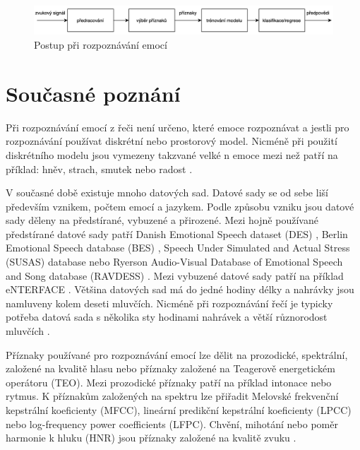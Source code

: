 \documentclass[FM,BP]{tulthesis}
\begin{document}
\begin{figure}[htbp]
\centerline{\includegraphics[width=\textwidth,height=\textheight,keepaspectratio]{speech_emotion_recognition-pipeline.png}}
\caption{Postup při rozpoznávání emocí}
\label{fig:ser_pipeline}
\end{figure}
\FloatBarrier

\section{Současné poznání} %
Při rozpoznávání emocí z řeči není určeno, které emoce rozpoznávat a jestli pro rozpoznávání používat diskrétní nebo prostorový model. Nicméně při použití diskrétního modelu jsou vymezeny takzvané velké n emoce mezi než patří na příklad: hněv, strach, smutek nebo radost \cite{konar_chakraborty_2015}.

V současné době existuje mnoho datových sad. Datové sady se od sebe liší především vznikem, počtem emocí a jazykem. Podle způsobu vzniku jsou datové sady děleny na předstírané, vybuzené a přirozené. Mezi hojně používané předstírané datové sady patří Danish Emotional Speech dataset (DES) \cite{DBLP:conf/interspeech/EngbergHAD97}, Berlin Emotional Speech database (BES) \cite{bes_dataset}, Speech Under Simulated and Actual Stress (SUSAS) database \cite{DBLP:conf/interspeech/HansenB97} nebo Ryerson Audio-Visual Database of Emotional Speech and Song database (RAVDESS) \cite{Livingstone2018}. Mezi vybuzené datové sady patří na příklad eNTERFACE \cite{DBLP:conf/icde/MartinKMP06}. Většina datových sad má do jedné hodiny délky a nahrávky jsou namluveny kolem deseti mluvčích. Nicméně při rozpoznávání řečí je typicky potřeba datová sada s několika sty hodinami nahrávek a větší různorodost mluvčích \cite{konar_chakraborty_2015}.

Příznaky používané pro rozpoznávání emocí lze dělit na prozodické, spektrální, založené na kvalitě hlasu nebo příznaky založené na Teagerově energetickém operátoru (TEO). Mezi prozodické příznaky patří na příklad intonace nebo rytmus. K příznakům založených na spektru lze přiřadit Melovské frekvenční kepstrální koeficienty (MFCC), lineární predikční kepstrální koeficienty (LPCC) nebo log-frequency power coeﬀicients (LFPC). Chvění, mihotání nebo poměr harmonie k hluku (HNR) jsou příznaky založené na kvalitě zvuku \cite{DBLP:journals/speech/AkcayO20}.
\end{document}
